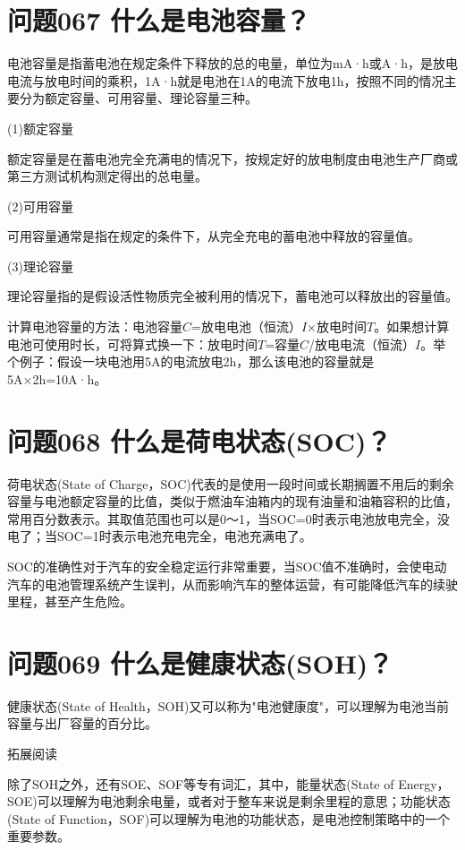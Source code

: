 \documentclass[12pt,UTF8]{ctexbook}
\begin{document}
\section{问题067 什么是电池容量？}

电池容量是指蓄电池在规定条件下释放的总的电量，单位为mA·h或A·h，是放电电流与放电时间的乘积，1A·h就是电池在1A的电流下放电1h，按照不同的情况主要分为额定容量、可用容量、理论容量三种。

(1)额定容量

额定容量是在蓄电池完全充满电的情况下，按规定好的放电制度由电池生产厂商或第三方测试机构测定得出的总电量。

(2)可用容量

可用容量通常是指在规定的条件下，从完全充电的蓄电池中释放的容量值。

(3)理论容量

理论容量指的是假设活性物质完全被利用的情况下，蓄电池可以释放出的容量值。

计算电池容量的方法：电池容量$C$=放电电池（恒流）$I$×放电时间$T$。如果想计算电池可使用时长，可将算式换一下：放电时间$T$=容量$C$/放电电流（恒流）$I$。举个例子：假设一块电池用5A的电流放电2h，那么该电池的容量就是5A×2h=10A·h。

\section{问题068 什么是荷电状态(SOC)？}

荷电状态(State of Charge，SOC)代表的是使用一段时间或长期搁置不用后的剩余容量与电池额定容量的比值，类似于燃油车油箱内的现有油量和油箱容积的比值，常用百分数表示。其取值范围也可以是0～1，当SOC=0时表示电池放电完全，没电了；当SOC=1时表示电池充电完全，电池充满电了。

SOC的准确性对于汽车的安全稳定运行非常重要，当SOC值不准确时，会使电动汽车的电池管理系统产生误判，从而影响汽车的整体运营，有可能降低汽车的续驶里程，甚至产生危险。

\section{问题069 什么是健康状态(SOH)？}

健康状态(State of Health，SOH)又可以称为"电池健康度"，可以理解为电池当前容量与出厂容量的百分比。

拓展阅读

除了SOH之外，还有SOE、SOF等专有词汇，其中，能量状态(State of Energy，SOE)可以理解为电池剩余电量，或者对于整车来说是剩余里程的意思；功能状态(State of Function，SOF)可以理解为电池的功能状态，是电池控制策略中的一个重要参数。
\end{document}
